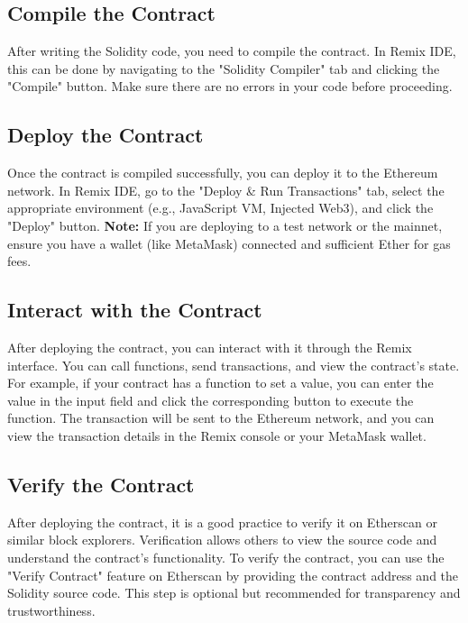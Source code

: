 \documentclass[12pt, a4paper]{article}
\begin{document}
\subsection{Compile the Contract}
After writing the Solidity code, you need to compile the contract. In Remix IDE, this can be done by navigating to the "Solidity Compiler" tab and clicking the "Compile" button. Make sure there are no errors in your code before proceeding.
\subsection{Deploy the Contract}
Once the contract is compiled successfully, you can deploy it to the Ethereum network. In Remix IDE, go to the "Deploy \& Run Transactions" tab, select the appropriate environment (e.g., JavaScript VM, Injected Web3), and click the "Deploy" button.
\textbf{Note:} If you are deploying to a test network or the mainnet, ensure you have a wallet (like MetaMask) connected and sufficient Ether for gas fees.
\subsection{Interact with the Contract}
After deploying the contract, you can interact with it through the Remix interface. You can call functions, send transactions, and view the contract's state. For example, if your contract has a function to set a value, you can enter the value in the input field and click the corresponding button to execute the function. The transaction will be sent to the Ethereum network, and you can view the transaction details in the Remix console or your MetaMask wallet.
\subsection{Verify the Contract}
After deploying the contract, it is a good practice to verify it on Etherscan or similar block explorers. Verification allows others to view the source code and understand the contract's functionality. To verify the contract, you can use the "Verify Contract" feature on Etherscan by providing the contract address and the Solidity source code. This step is optional but recommended for transparency and trustworthiness.    
\end{document}
